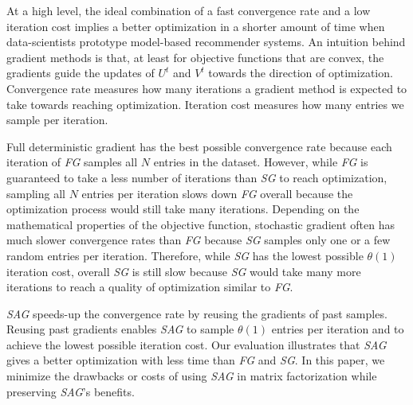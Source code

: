 At a high level, the ideal combination of a fast convergence rate and a low iteration cost implies a better optimization in a shorter amount of time when data-scientists prototype model-based recommender systems.
An intuition behind gradient methods is that, at least for objective functions that are convex, the gradients guide the updates of $U^t$ and $V^t$ towards the direction of optimization.  
Convergence rate measures how many iterations a gradient method is expected to take towards reaching optimization. 
Iteration cost measures how many entries we sample per iteration.

Full deterministic gradient has the best possible convergence rate because each iteration of \emph{FG} samples all $N$ entries in the dataset.
However, while \emph{FG} is guaranteed to take a less number of iterations than \emph{SG} to reach optimization, sampling all $N$ entries per iteration slows down \emph{FG} overall because the optimization process would still take many iterations.
Depending on the mathematical properties of the objective function, stochastic gradient often has much slower convergence rates than \emph{FG} because \emph{SG} samples only one or a few random entries per iteration.
Therefore, while \emph{SG} has the lowest possible $\theta(1)$ iteration cost, overall \emph{SG} is still slow because \emph{SG} would take many more iterations to reach  a quality of optimization similar to \emph{FG}.

\emph{SAG} speeds-up the convergence rate by reusing the gradients of past samples.  
Reusing past gradients enables \emph{SAG} to sample $\theta(1)$ entries per iteration and to achieve the lowest possible iteration cost.  
Our evaluation illustrates that \emph{SAG} gives a better optimization with less time than \emph{FG} and \emph{SG}.  
In this paper, we minimize the drawbacks or costs of using \emph{SAG} in matrix factorization while preserving \emph{SAG}'s benefits.

